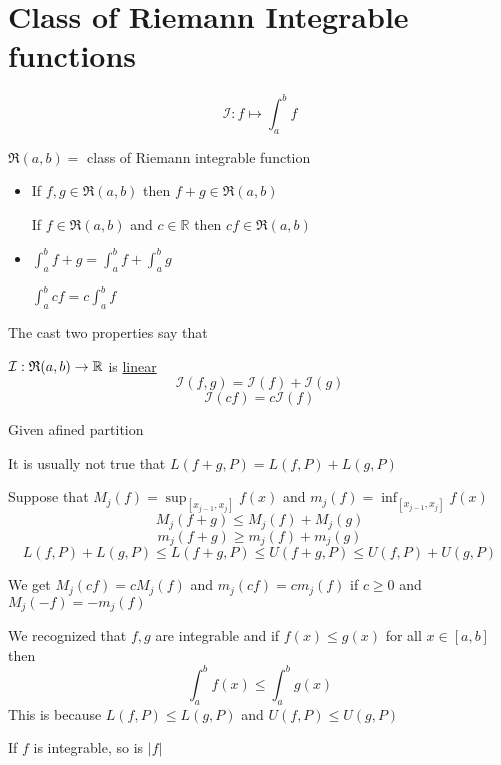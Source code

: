 \section{Class of Riemann Integrable functions}

\[ \mathcal{I}: f \mapsto \int_a^b f\]

$\mathfrak{R}(a, b) = $ class of Riemann integrable function

\begin{itemize}
  \item If $f, g \in \mathfrak{R}(a, b)$ then $f+g \in \mathfrak{R}(a, b)$

  If $f \in \mathfrak{R}(a, b)$ and $c \in \mathbb{R}$ then $cf \in \mathfrak{R}(a, b)$
  \item $\displaystyle\int_a^b f+g = \int_a^b f + \int_a^b g$

   $\displaystyle\int_a^b cf = c\int_a^b f$
\end{itemize}

The cast two properties say that 

$\mathcal{I} :\mathfrak{R}(a, b) \to \mathbb R$ is \underline{linear}
$$\mathcal{I}(f, g) = \mathcal{I}(f) + \mathcal{I}(g)$$
$$\mathcal{I}(cf) = c\mathcal{I}(f)$$

Given afined partition

It is usually not true that $L(f + g, P) = L(f, P) + L(g, P)$

Suppose that $M_j(f) = \sup_{[x_{j-1}, x_j]} f(x)$ and $m_j(f) = \inf_{[x_{j-1}, x_j]} f(x)$
$$M_j(f + g) \le M_j(f) + M_j(g)$$
$$m_j(f + g) \ge m_j(f) + m_j(g)$$
$$L(f, P) + L(g, P) \le L(f+g, P) \le U(f + g, P) \le U(f, P) + U(g, P)$$

We get $M_j(cf) = cM_j(f)$ and $m_j(cf) = cm_j(f)$ if $c \ge 0$ and $M_j(-f) = -m_j(f)$

We recognized that $f, g$ are integrable and if $f(x) \le g(x)$ for all $x \in [a, b]$ then
\[\int_a^bf(x) \le \int_a^bg(x)\]
This is because $L(f, P) \le L(g, P)$ and $U(f, P) \le U(g, P)$

\begin{theorem*}
  If $f$ is integrable, so is $|f|$
\end{theorem*}

